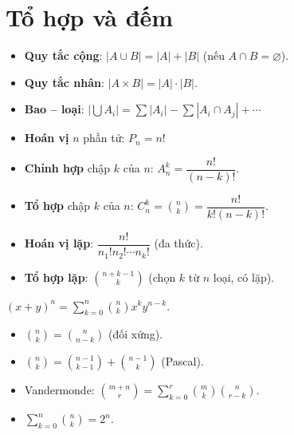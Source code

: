 \documentclass[12pt,a4paper]{article}
\begin{document}
\section{Tổ hợp và đếm}

\begin{congthuc}[title={Quy tắc đếm cơ bản}]
  \begin{itemize}
    \item \textbf{Quy tắc cộng}: $|A \cup B| = |A| + |B|$ (nếu $A \cap B = \varnothing$).
    \item \textbf{Quy tắc nhân}: $|A \times B| = |A| \cdot |B|$.
    \item \textbf{Bao -- loại}: $\left|\bigcup A_i\right| = \sum|A_i| - \sum|A_i \cap A_j| + \cdots$
  \end{itemize}
\end{congthuc}

\begin{congthuc}[title={Hoán vị, chỉnh hợp, tổ hợp}]
  \begin{itemize}
    \item \textbf{Hoán vị} $n$ phần tử: $P_n = n!$
    \item \textbf{Chỉnh hợp} chập $k$ của $n$: $A_n^k = \dfrac{n!}{(n-k)!}$.
    \item \textbf{Tổ hợp} chập $k$ của $n$: $C_n^k = \binom{n}{k} = \dfrac{n!}{k!(n-k)!}$.
    \item \textbf{Hoán vị lặp}: $\dfrac{n!}{n_1! n_2! \cdots n_k!}$ (đa thức).
    \item \textbf{Tổ hợp lặp}: $\binom{n+k-1}{k}$ (chọn $k$ từ $n$ loại, có lặp).
  \end{itemize}
\end{congthuc}

\begin{dinhly}[title={Nhị thức Newton}]
  $(x + y)^n = \displaystyle\sum_{k=0}^{n} \binom{n}{k} x^k y^{n-k}$.
\end{dinhly}

\begin{tinhchat}[title={Đồng nhất thức tổ hợp}]
  \begin{itemize}
    \item $\binom{n}{k} = \binom{n}{n-k}$ (đối xứng).
    \item $\binom{n}{k} = \binom{n-1}{k-1} + \binom{n-1}{k}$ (Pascal).
    \item Vandermonde: $\binom{m+n}{r} = \sum_{k=0}^{r}\binom{m}{k}\binom{n}{r-k}$.
    \item $\sum_{k=0}^n \binom{n}{k} = 2^n$.
  \end{itemize}
\end{tinhchat}
\end{document}
